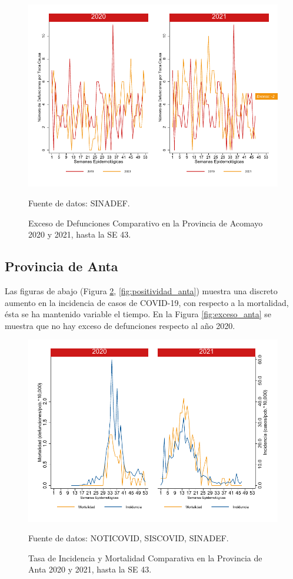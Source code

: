 \documentclass[12pt,a4paper,openany]{book}
\begin{document}
		\begin{figure}[h]
			\caption{Exceso de Defunciones Comparativo en la Provincia de Acomayo 2020 y 2021, hasta la SE 43.}\label{fig:exceso_acomayo}
			\begin{center}
				\includegraphics[width=0.7\linewidth]{../figuras/exceso_1}
			\end{center}
			{\footnotesize {Fuente de datos: SINADEF.}}
		\end{figure}
		
		\clearpage
		
		\subsection*{Provincia de Anta}
		\noindent Las figuras de abajo (Figura \ref{fig:inc_mort_anta}, \ref{fig:positividad_anta})  muestra una discreto aumento en la incidencia de casos de COVID-19, con respecto a la mortalidad, ésta se  ha mantenido variable el tiempo. En la Figura \ref{fig:exceso_anta} se muestra que no hay exceso de defunciones respecto al año 2020.
		
		\begin{figure}[h]
			\caption{Tasa de Incidencia y Mortalidad Comparativa en la Provincia de Anta 2020 y 2021, hasta la SE 43.}\label{fig:inc_mort_anta}
			\begin{center}
				\includegraphics[width=0.7\linewidth]{../figuras/incidencia_mortalidad_20_21_2}
			\end{center}
			{\footnotesize {Fuente de datos: NOTICOVID, SISCOVID, SINADEF.}}
		\end{figure}
		
\end{document}
